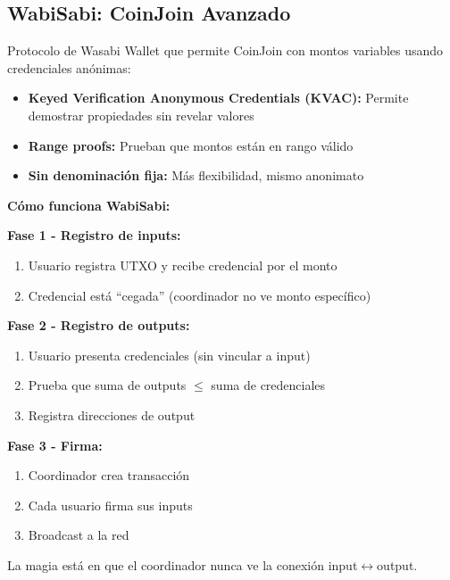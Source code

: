 \documentclass[11pt,a4paper,twoside]{book}
\begin{document}
\subsection{WabiSabi: CoinJoin Avanzado}

\begin{definition}[WabiSabi]
Protocolo de Wasabi Wallet que permite CoinJoin con montos variables usando credenciales an\'onimas:
\begin{itemize}
    \item \textbf{Keyed Verification Anonymous Credentials (KVAC):} Permite demostrar propiedades sin revelar valores
    \item \textbf{Range proofs:} Prueban que montos est\'an en rango v\'alido
    \item \textbf{Sin denominaci\'on fija:} M\'as flexibilidad, mismo anonimato
\end{itemize}
\end{definition}

\begin{mathnote}
\textbf{C\'omo funciona WabiSabi:}

\textbf{Fase 1 - Registro de inputs:}
\begin{enumerate}
    \item Usuario registra UTXO y recibe credencial por el monto
    \item Credencial est\'a ``cegada'' (coordinador no ve monto espec\'ifico)
\end{enumerate}

\textbf{Fase 2 - Registro de outputs:}
\begin{enumerate}
    \item Usuario presenta credenciales (sin vincular a input)
    \item Prueba que suma de outputs $\leq$ suma de credenciales
    \item Registra direcciones de output
\end{enumerate}

\textbf{Fase 3 - Firma:}
\begin{enumerate}
    \item Coordinador crea transacci\'on
    \item Cada usuario firma sus inputs
    \item Broadcast a la red
\end{enumerate}

La magia est\'a en que el coordinador nunca ve la conexi\'on input$\leftrightarrow$output.
\end{mathnote}
\end{document}
